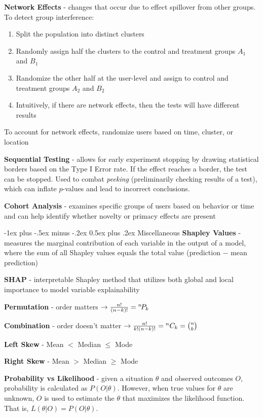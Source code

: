 \documentclass[10pt,landscape]{article}
\makeatletter
\renewcommand{\section}{\@startsection{section}{1}{0mm}%
                                {-1ex plus -.5ex minus -.2ex}%
                                {0.5ex plus .2ex}%
                                {\normalfont\large\bfseries}}
\makeatother
\begin{document}
\begin{multicols}{3}
        \textbf{Network Effects} - changes that occur due to effect spillover from other groups. To detect group interference:
        \begin{enumerate}[leftmargin=5mm]
            \itemsep -.4mm
            \item Split the population into distinct clusters
            \item Randomly assign half the clusters to the control and treatment groups $A_1$ and $B_1$
            \item Randomize the other half at the user-level and assign to control and treatment groups
                  $A_2$ and $B_2$
            \item Intuitively, if there are network effects, then the tests will have different results
        \end{enumerate}
        To account for network effects, randomize users based on time, cluster, or location
        \smallskip

        \textbf{Sequential Testing} - allows for early experiment stopping by drawing statistical borders based on the Type I Error rate. If the effect reaches a border, the test can be stopped. Used to combat \emph{peeking} (preliminarily checking results of a test), which can inflate $p$-values and lead to incorrect conclusions.

        \textbf{Cohort Analysis} - examines specific groups of users based on behavior or time and can help identify whether novelty or primacy effects are present

        \section{Miscellaneous}
        \textbf{Shapley Values} - measures the marginal contribution of each variable in the output of a model, where the sum of all Shapley values equals the total value (prediction $-$ mean prediction)

        \textbf{SHAP} - interpretable Shapley method that utilizes both global and local importance to model variable explainability

        \textbf{Permutation} - order matters  $\to \frac{n!}{(n-k)!} = {}^{n}\!P_{k}$

        \textbf{Combination} - order doesn't matter $\to \frac{n!}{k!(n-k)!}= {}^{n}C_{k}= \binom nk$

        \textbf{Left Skew} - Mean $<$ Median $\leq$ Mode

        \textbf{Right Skew} - Mean $>$ Median $\geq$ Mode

        \textbf{Probability vs Likelihood} - given a situation $\theta$ and observed outcomes $O$, probability is calculated as $P(O|\theta)$. However, when true values for $\theta$ are unknown, $O$ is used to estimate the $\theta$ that maximizes the likelihood function. That is, $L(\theta|O) = P(O|\theta)$.
    \newpage
\end{multicols}
\end{document}
